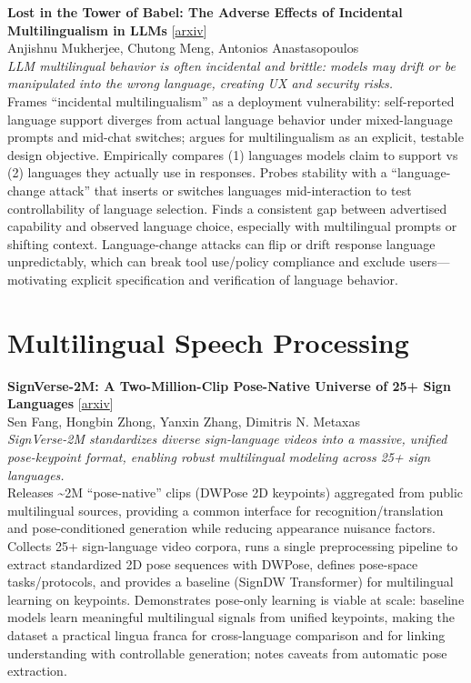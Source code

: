 \documentclass[12pt,letterpaper]{article}
\begin{document}
\medskip

{\small\textbf{Lost in the Tower of Babel: The Adverse Effects of Incidental Multilingualism in LLMs}} {\scriptsize[\href{https://arxiv.org/abs/2605.01224}{arxiv}]}\\
{\scriptsize Anjishnu Mukherjee, Chutong Meng, Antonios Anastasopoulos}\\

{\small\textit{LLM multilingual behavior is often incidental and brittle: models may drift or be manipulated into the wrong language, creating UX and security risks.}}\\[1pt]
{\footnotesize Frames ``incidental multilingualism'' as a deployment vulnerability: self-reported language support diverges from actual language behavior under mixed-language prompts and mid-chat switches; argues for multilingualism as an explicit, testable design objective. Empirically compares (1) languages models claim to support vs (2) languages they actually use in responses. Probes stability with a ``language-change attack'' that inserts or switches languages mid-interaction to test controllability of language selection. Finds a consistent gap between advertised capability and observed language choice, especially with multilingual prompts or shifting context. Language-change attacks can flip or drift response language unpredictably, which can break tool use/policy compliance and exclude users---motivating explicit specification and verification of language behavior.}

\medskip


\section*{Multilingual Speech Processing}

{\small\textbf{SignVerse-2M: A Two-Million-Clip Pose-Native Universe of 25+ Sign Languages}} {\scriptsize[\href{https://arxiv.org/abs/2605.01720}{arxiv}]}\\
{\scriptsize Sen Fang, Hongbin Zhong, Yanxin Zhang, Dimitris N. Metaxas}\\

{\small\textit{SignVerse-2M standardizes diverse sign-language videos into a massive, unified pose-keypoint format, enabling robust multilingual modeling across 25+ sign languages.}}\\[1pt]
{\footnotesize Releases \textasciitilde{}2M ``pose-native'' clips (DWPose 2D keypoints) aggregated from public multilingual sources, providing a common interface for recognition/translation and pose-conditioned generation while reducing appearance nuisance factors. Collects 25+ sign-language video corpora, runs a single preprocessing pipeline to extract standardized 2D pose sequences with DWPose, defines pose-space tasks/protocols, and provides a baseline (SignDW Transformer) for multilingual learning on keypoints. Demonstrates pose-only learning is viable at scale: baseline models learn meaningful multilingual signals from unified keypoints, making the dataset a practical lingua franca for cross-language comparison and for linking understanding with controllable generation; notes caveats from automatic pose extraction.}
\end{document}
